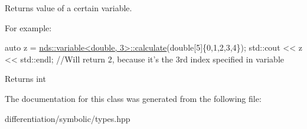 Returns value of a certain variable. 

For example\+: 
\begin{DoxyCode}
\textcolor{keyword}{auto} z = \hyperlink{classnumpp_1_1differentiation_1_1symbolic_1_1variable_ad73b5d668d3bcf9802a0464ea3389ac6}{nds::variable<double, 3>::calculate}(\textcolor{keywordtype}{double}[5]\{0,1,2,3,4\});
std::cout << z << std::endl;
\textcolor{comment}{//Will return 2, because it's the 3rd index specified in variable}
\end{DoxyCode}


\begin{DoxyReturn}{Returns}
int 
\end{DoxyReturn}


The documentation for this class was generated from the following file\+:\begin{DoxyCompactItemize}
\item 
differentiation/symbolic/types.\+hpp\end{DoxyCompactItemize}
